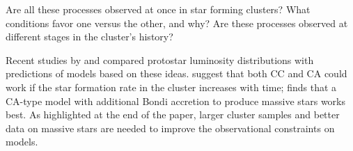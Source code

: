 Are all these processes observed at once in star forming clusters? What conditions favor one versus the other, and why? Are these processes observed at different stages in the cluster's history?

Recent studies by \citet{Offner:2011ex} and \citet{Myers:2011fy} compared protostar luminosity distributions with predictions of models based on these ideas. \citet{Offner:2011ex} suggest that both CC and CA could work if the star formation rate in the cluster increases with time; \citep{Myers:2011fy} finds that a CA-type model with additional Bondi accretion to produce massive stars works best. As highlighted at the end of the \citet{Offner:2011ex} paper, larger cluster samples and better data on massive stars are needed to improve the observational constraints on models.


%
%
%



